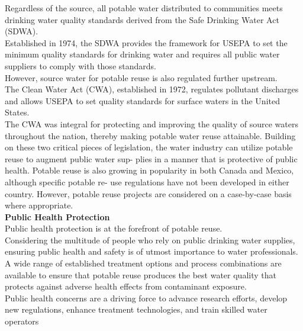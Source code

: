 \documentclass{article}
\begin{document}
Regardless of the source, all potable water distributed to communities meets drinking water quality standards derived from the Safe Drinking Water Act (SDWA). \\
Established in 1974, the SDWA provides the framework for USEPA to set the minimum quality standards for drinking water and requires all public water suppliers to comply with those standards.\\ 
However, source water for potable reuse is also regulated further upstream. \\
The Clean Water Act (CWA), established in 1972, regulates pollutant discharges and allows USEPA to set quality standards for surface waters in the United States. \\
The CWA was integral for protecting and improving the quality of source waters throughout the nation, thereby making potable water reuse attainable. Building on these two critical pieces of legislation, the water industry can utilize potable reuse to augment public water sup- plies in a manner that is protective of public health.
Potable reuse is also growing in popularity in both Canada and Mexico, although specific potable re- use regulations have not been developed in either country. However, potable reuse projects are considered on a case-by-case basis where appropriate.\\
\textbf{Public Health Protection}\\
Public health protection is at the forefront of potable reuse. \\
Considering the multitude of people who rely on public drinking water supplies, ensuring public health and safety is of utmost importance to water professionals. \\
A wide range of established treatment options and process combinations are available to ensure that potable reuse produces the best water quality that protects against adverse health effects from contaminant exposure. \\
Public health concerns are a driving force to advance research efforts, develop new regulations, enhance treatment technologies, and train skilled water operators
\end{document}

